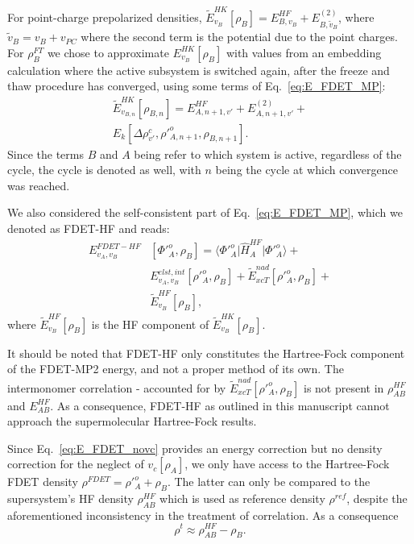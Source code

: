 \documentclass[journal=jctcce,manuscript=article, layout=twocolumn]{achemso}
\begin{document}
 For point-charge prepolarized densities, $\tilde{E}^{HK}_{v_B}[\rho_B] = E^{HF}_{B,v_B} + E^{(2)}_{B,\tilde{v}_B}$, where $\tilde{v}_B = v_B + v_{PC}$ where the second term is the potential due to the point charges.
 For $\rho_B^{FT}$ we chose to approximate $E^{HK}_{v_B}[\rho_B]$ with values from an embedding calculation where the active subsystem is switched again, after the freeze and thaw procedure has converged, using some terms of Eq.~\ref{eq:E_FDET_MP}:
\begin{align} \label{eq:HK_B_FT}
 \tilde{E}^{HK}_{v_{B,n}}[\rho_{B,n}] = E^{HF}_{A,n+1,v'} + E^{(2)}_{A,n+1,v'} + \\ \nonumber
 E_k[\Delta \rho^c_{v'}, \rho'^{o}_{A,n+1}, \rho_{B,n+1}].
\end{align}
Since the terms $B$ and $A$ being refer to which system is active, regardless of the cycle, the cycle is denoted as well, with $n$ being the cycle at which convergence was reached.

We also considered the self-consistent part of Eq.~\ref{eq:E_FDET_MP}, which we denoted as FDET-HF and reads:
\begin{align} \label{eq:E_FDET_HF}
 E_{v_A,v_B}^{FDET-HF} & [\Phi'^{o}_{A},\rho_B] =  \langle\Phi'^{o}_{A}\vert \hat{H}^{HF}_A\vert \Phi'^{o}_{A}\rangle + \\ \nonumber
& E^{elst,int}_{v_A,v_B}[\rho'^{o}_A,\rho_B] + \tilde{E}_{xcT}^{nad}[\rho'^{o}_A,\rho_B] + \\ \nonumber
& \tilde{E}^{HF}_{v_B}[\rho_B],
\end{align}
where $\tilde{E}^{HF}_{v_B}[\rho_B]$ is the HF component of $ \tilde{E}^{HK}_{v_B}[\rho_B]$.

It should be noted that FDET-HF only constitutes the Hartree-Fock component of the FDET-MP2 energy, and not a proper method of its own. The intermonomer correlation - accounted for by $\tilde{E}_{xcT}^{nad}[\rho'^{o}_A,\rho_B]$ is not present in $\rho^{HF}_{AB}$ and $E^{HF}_{AB}$. As a consequence, FDET-HF as outlined in this manuscript cannot approach the supermolecular Hartree-Fock results.

Since Eq.~\ref{eq:E_FDET_novc} provides an energy correction but no density correction for the neglect of $v_c[\rho_A]$, we only have access to the Hartree-Fock FDET density $\rho^{FDET} = \rho'^{o}_A + \rho_{B}$. The latter can only be compared to the supersystem's HF density $\rho^{HF}_{AB}$ which is used as reference density $\rho^{ref}$, despite the aforementioned inconsistency in the treatment of correlation. As a consequence
\begin{equation}
 \rho^t \approx \rho_{AB}^{HF} - \rho_B.
\end{equation}
\end{document}
